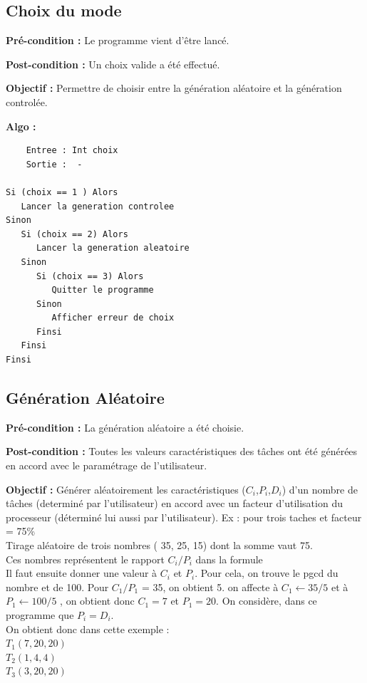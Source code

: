 		\subsection{Choix du mode}
			\textbf{Pré-condition :} Le programme vient d’être lancé.

			\textbf{Post-condition :} Un choix valide a été effectué.
			
			\textbf{Objectif :} Permettre de choisir entre la génération aléatoire et la génération controlée.
			
			\textbf{Algo :}
			\begin{lstlisting} 
	Entree : Int choix
	Sortie :  -

Si (choix == 1 ) Alors
   Lancer la generation controlee
Sinon
   Si (choix == 2) Alors
	  Lancer la generation aleatoire 
   Sinon
	  Si (choix == 3) Alors
	     Quitter le programme
	  Sinon
	     Afficher erreur de choix 
	  Finsi
   Finsi
Finsi
		\end{lstlisting} 

	\newpage
		\subsection{Génération Aléatoire}
			\textbf{Pré-condition :} La génération aléatoire a été choisie.
		
			\textbf{Post-condition :} Toutes les valeurs caractéristiques des tâches ont été générées en accord avec le paramétrage de l’utilisateur.

			\textbf{Objectif :} Générer aléatoirement les caractéristiques ($C_i$,$P_i$,$D_i$) d’un nombre de tâches (determiné par l’utilisateur) en accord avec un facteur d’utilisation du processeur (déterminé lui aussi par l’utilisateur).
			Ex : pour trois taches et facteur = 75\% \\ 


		    Tirage aléatoire de trois nombres ( 35, 25, 15) dont la somme vaut 75. \\
		    Ces nombres représentent le rapport $C_i/P_i$ dans la formule  \\
		    Il faut ensuite donner une valeur à $C_i$ et $P_i$. Pour cela, on trouve le pgcd du nombre et de 100. Pour $C_1/P_1$ = 35, on obtient 5.  on affecte à $C_1 \leftarrow 35/5$ et à $P_1 \leftarrow 100/5$ , on obtient donc $C_1 = 7$ et $P_1 = 20$. On considère, dans ce programme que $P_i = D_i$. \\
		    
		    On obtient donc dans cette exemple :  \\
		    $T_1(7,20,20)$ \\
		    $T_2(1,4,4)$ \\
		    $T_3(3,20,20)$ \\

